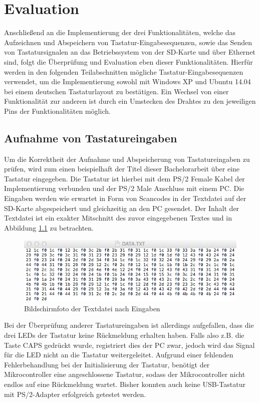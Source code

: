 \chapter{Evaluation}
\label{evaluation}
Anschließend an die Implementierung der drei Funktionalitäten, welche das Aufzeichnen und Abspeichern von Tastatur-Eingabesequenzen, sowie das Senden von Tastatursignalen an das Betriebssystem von der SD-Karte und über Ethernet sind, folgt die Überprüfung und Evaluation eben dieser Funktionalitäten. Hierfür werden in den folgenden Teilabschnitten mögliche Tastatur-Eingabesequenzen verwendet, um die Implementierung sowohl mit Windows XP und Ubuntu 14.04 bei einem deutschen Tastaturlayout zu bestätigen. Ein Wechsel von einer Funktionalität zur anderen ist durch ein Umstecken des Drahtes zu den jeweiligen Pins der Funktionalitäten möglich.



\section{Aufnahme von Tastatureingaben}
Um die Korrektheit der Aufnahme und Abspeicherung von Tastatureingaben zu prüfen, wird zum einen beispielhaft der Titel dieser Bachelorarbeit über eine Tastatur eingegeben. Die Tastatur ist hierbei mit dem PS/2 Female Kabel der Implementierung verbunden und der PS/2 Male Anschluss mit einem PC. Die Eingaben werden wie erwartet in Form von Scancodes in der Textdatei auf der SD-Karte abgespeichert und gleichzeitig an den PC gesendet. Der Inhalt der Textdatei ist ein exakter Mitschnitt des zuvor eingegebenen Textes und in Abbildung \ref{reader} zu betrachten.
\begin{figure}
  \centering
  \includegraphics[width=1\textwidth]{images/reader.jpg}
  \caption{Bildschirmfoto der Textdatei nach Eingaben}
  \label{reader}
\end{figure}

\noindent Bei der Überprüfung anderer Tastatureingaben ist allerdings aufgefallen, dass die drei LEDs der Tastatur keine Rückmeldung erhalten haben. Falls also z.B. die Taste CAPS gedrückt wurde, registriert dies der PC zwar, jedoch wird das Signal für die LED nicht an die Tastatur weitergeleitet. Aufgrund einer fehlenden Fehlerbehandlung bei der Initialisierung der Tastatur, benötigt der Mikrocontroller eine angeschlossene Tastatur, sodass der Mikrocontroller nicht endlos auf eine Rückmeldung wartet. Bisher konnten auch keine USB-Tastatur mit PS/2-Adapter erfolgreich getestet werden.



